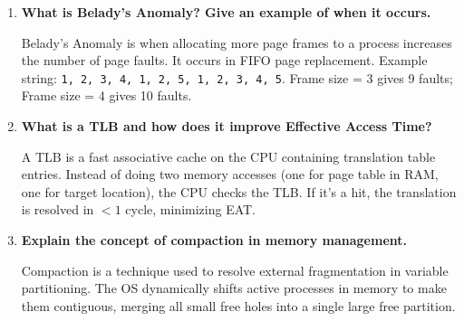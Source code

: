\documentclass[12pt,a4paper]{article}
\newcommand{\Q}[1]{\textbf{#1}\par\noindent\ignorespaces}
\begin{document}
\begin{tcolorbox}[exambox, title={\textbf{Frequently Asked / Viva Questions}}]
\begin{enumerate}[topsep=0pt, label=\textbf{Q\arabic*.}, itemsep=5pt]
\begin{itemize}[leftmargin=*, itemsep=2.5pt, topsep=2pt]
      \item \textbf{Ref 3:} [2, 0, 3] (replaces 1) - Fault 5
      \item \textbf{Ref 0:} [2, 0, 3] - Hit
      \item \textbf{Ref 4:} [4, 0, 3] (replaces 2) - Fault 6
      \item \textbf{Ref 2:} [4, 0, 2] (replaces 3) - Fault 7
      \item \textbf{Ref 3:} [3, 0, 2] (replaces 4) - Fault 8. \textbf{Total Faults = 8.}
    \end{itemize}
    \textbf{(c) Optimal:} Frames status:\par
    \begin{itemize}[leftmargin=*, itemsep=2.5pt, topsep=2pt]
      \item \textbf{Ref 7, 0, 1:} [7, 0, 1] - Faults = 3
      \item \textbf{Ref 2:} [2, 0, 1] (replaces 7, unused furthest) - Fault 4
      \item \textbf{Ref 0:} [2, 0, 1] - Hit
      \item \textbf{Ref 3:} [2, 0, 3] (replaces 1, unused furthest) - Fault 5
      \item \textbf{Ref 0:} [2, 0, 3] - Hit
      \item \textbf{Ref 4:} [4, 0, 3] (replaces 2, unused furthest) - Fault 6
      \item \textbf{Ref 2:} [2, 0, 3] (replaces 4) - Fault 7
      \item \textbf{Ref 3:} [2, 0, 3] - Hit. \textbf{Total Faults = 7.}
    \end{itemize}
  \item \Q{What is Belady's Anomaly? Give an example of when it occurs.}
    Belady's Anomaly is when allocating more page frames to a process increases the number of page faults. It occurs in FIFO page replacement. Example string: \texttt{1, 2, 3, 4, 1, 2, 5, 1, 2, 3, 4, 5}. Frame size = 3 gives 9 faults; Frame size = 4 gives 10 faults.
  \item \Q{What is a TLB and how does it improve Effective Access Time?}
    A TLB is a fast associative cache on the CPU containing translation table entries. Instead of doing two memory accesses (one for page table in RAM, one for target location), the CPU checks the TLB. If it's a hit, the translation is resolved in $< 1$ cycle, minimizing EAT.
  \item \Q{Explain the concept of compaction in memory management.}
    Compaction is a technique used to resolve external fragmentation in variable partitioning. The OS dynamically shifts active processes in memory to make them contiguous, merging all small free holes into a single large free partition.

\end{enumerate}
\end{tcolorbox}
\end{document}

